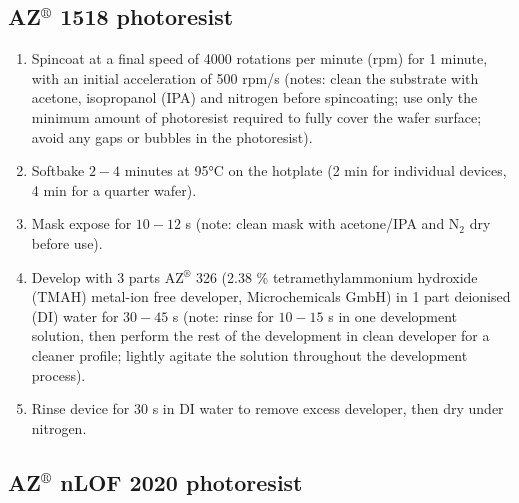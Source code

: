\documentclass[
  a4paper,
]{scrbook}
\begin{document}
\hypertarget{azcircledr-1518-photoresist}{%
\subsection{\texorpdfstring{AZ\(^\circledR\) 1518
photoresist}{AZ\^{}\textbackslash circledR 1518 photoresist}}\label{azcircledr-1518-photoresist}}

\begin{enumerate}
\def\labelenumi{\arabic{enumi}.}
\item
  Spincoat at a final speed of 4000 rotations per minute (rpm) for 1
  minute, with an initial acceleration of 500 rpm/s (notes: clean the
  substrate with acetone, isopropanol (IPA) and nitrogen before
  spincoating; use only the minimum amount of photoresist required to
  fully cover the wafer surface; avoid any gaps or bubbles in the
  photoresist).
\item
  Softbake \(2-4\) minutes at 95°C on the hotplate (2 min for individual
  devices, 4 min for a quarter wafer).
\item
  Mask expose for \(10-12\) s (note: clean mask with acetone/IPA and
  N\(_2\) dry before use).
\item
  Develop with 3 parts AZ\(^\circledR\) 326 (2.38 \% tetramethylammonium
  hydroxide (TMAH) metal-ion free developer, Microchemicals GmbH) in 1
  part deionised (DI) water for \(30-45\) s (note: rinse for \(10-15\) s
  in one development solution, then perform the rest of the development
  in clean developer for a cleaner profile; lightly agitate the solution
  throughout the development process).
\item
  Rinse device for 30 s in DI water to remove excess developer, then dry
  under nitrogen.
\end{enumerate}

\hypertarget{azcircledr-nlof-2020-photoresist}{%
\subsection{\texorpdfstring{AZ\(^\circledR\) nLOF 2020
photoresist}{AZ\^{}\textbackslash circledR nLOF 2020 photoresist}}\label{azcircledr-nlof-2020-photoresist}}
\end{document}
